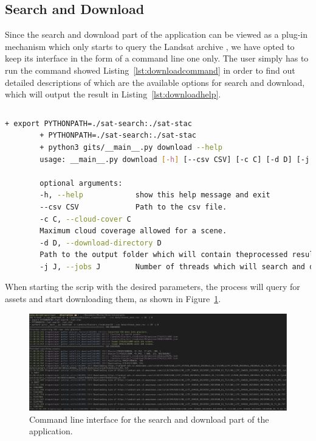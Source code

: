 \documentclass[12pt, a4paper]{report}
\begin{document}
	\subsection{Search and Download}
	\label{sec:search_download}
	
	\par Since the search and download part of the application can be viewed as a plug-in mechanism which only starts to query the Landsat archive , we have opted to keep its interface in the form of a command line one only. The user simply has to run the command showed Listing~\ref{lst:downloadcommand} in order to find out detailed descriptions of which are the available options for search and download, which will output the result in Listing~\ref{lst:downloadhelp}.
	
	\begin{lstlisting}[caption={Help command for sarch and download.},label={lst:downloadcommand},language=Bash]
		% bash -x run_download.sh --help
	\end{lstlisting}
	
	\begin{lstlisting}[caption={Detailed parameters required for the download script.},label={lst:downloadhelp},language=Bash]
		+ export PYTHONPATH=./sat-search:./sat-stac
		+ PYTHONPATH=./sat-search:./sat-stac
		+ python3 gits/__main__.py download --help
		usage: __main__.py download [-h] [--csv CSV] [-c C] [-d D] [-j J]
		
		optional arguments:
		-h, --help            show this help message and exit
		--csv CSV             Path to the csv file.
		-c C, --cloud-cover C
		Maximum cloud coverage allowed for a scene.
		-d D, --download-directory D
		Path to the output folder which will contain theprocessed results.
		-j J, --jobs J        Number of threads which will search and download.
	\end{lstlisting}
	
	When starting the scrip with the desired parameters, the process will query for assets and start downloading them, as shown in Figure~\ref{fig:download_cmd}.
	
	\begin{figure}[h!]
		\centering
		\includegraphics[width=\columnwidth]{../images/download_cmd.png}
		\caption{Command line interface for the search and download part of the application.}
		\label{fig:download_cmd}
	\end{figure}
	
\end{document}

